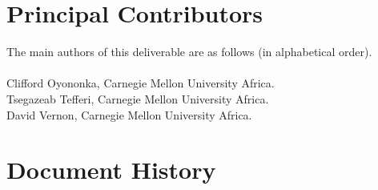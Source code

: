 \documentclass{CSSRforAfrica}
\newcommand{\blank}{~\\}
\begin{document}
 

\pagebreak
\section*{Principal Contributors}
\label{contributors}
The main authors of this deliverable are as follows (in alphabetical order).
\blank
~
\blank
Clifford Oyononka, Carnegie Mellon University Africa.\\
Tsegazeab Tefferi, Carnegie Mellon University Africa.\\    
David Vernon, Carnegie Mellon University Africa.\\   
  

\newpage
\section*{Document History}
\label{document_history}
\end{document}
